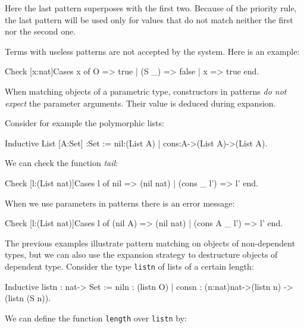 Here the last pattern superposes with the first two. Because
of the priority rule, the last pattern 
will be used only for values that do not match neither the  first nor
the second one.  

Terms with useless patterns are not accepted by the
system. Here is an example:
\begin{coq_example}
Check [x:nat]Cases x of O => true | (S _) => false | x => true end.
\end{coq_example}

When matching objects of a parametric type, constructors in patterns
{\em do not expect} the parameter arguments. Their value is deduced
during expansion.

Consider for example the polymorphic lists:

\begin{coq_example}
Inductive List [A:Set] :Set := 
  nil:(List A) 
| cons:A->(List A)->(List A).
\end{coq_example}

We can check the function {\em tail}:

\begin{coq_example}
Check [l:(List nat)]Cases l of 
                             nil        => (nil nat)
                          | (cons _ l') => l'
                           end.
\end{coq_example}


When we use parameters in patterns there is an error message:
\begin{coq_example}
Check [l:(List nat)]Cases l of 
                             (nil A)      => (nil nat)
                          | (cons A _ l') => l'
                           end.
\end{coq_example}



The previous examples illustrate pattern matching on objects of
non-dependent types, but we can also 
use the expansion strategy to destructure objects of dependent type.
Consider the type \texttt{listn} of lists of a certain length:

\begin{coq_example}
Inductive listn : nat-> Set := 
  niln : (listn O) 
| consn : (n:nat)nat->(listn n) -> (listn (S n)).
\end{coq_example}

We can define the function \texttt{length} over \texttt{listn} by:

